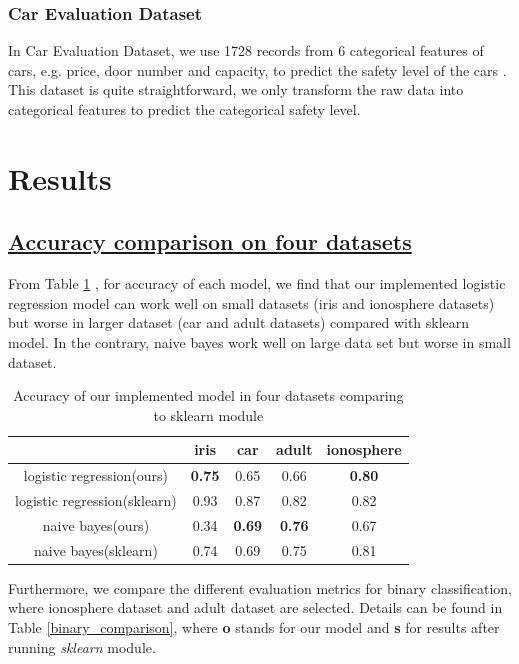 \documentclass[11pt]{scrartcl}
\begin{document}
\subsubsection*{Car Evaluation Dataset}
In Car Evaluation Dataset, we use 1728 records from 6 categorical features of cars, e.g. price, door number and capacity, to predict the safety level of the cars \cite{bohanec1988knowledge}. This dataset is quite straightforward, we only transform the raw data into categorical features to predict the categorical safety level.


\section{Results}
\subsection*{\underline{Accuracy comparison on four datasets}}

From Table \ref{accuracy_fourdata} , for accuracy of each model, we find that our implemented logistic regression model can work well on small datasets (iris and ionosphere datasets) but worse in larger dataset (car and adult datasets) compared with sklearn model. In the contrary, naive bayes work well on large data set but worse in small dataset.

\begin{table}[H]
	\centering
	\begin{tabular}{c|cccc}
		\hline
		 & iris	 & car & adult & ionosphere \\
		\hline
		logistic regression(ours) &  \textbf{0.75} & 0.65 & 0.66 & \textbf{0.80}\\
		logistic regression(sklearn) & 0.93 & 0.87 & 0.82 & 0.82\\
		naive bayes(ours) & 0.34 &  \textbf{0.69} & \textbf{0.76} & 0.67 \\
		naive bayes(sklearn) & 0.74 & 0.69 & 0.75 & 0.81 \\
		\hline
	\end{tabular} 
	\caption{Accuracy of our implemented model in four datasets comparing to sklearn module}
	\label{accuracy_fourdata}
\end{table}

Furthermore, we compare the different evaluation metrics for binary classification, where ionosphere dataset and adult dataset are selected. Details can be found in Table \ref{binary_comparison}, where \textbf{o} stands for our model and \textbf{s} for results after running \textit{sklearn} module.
\end{document}
